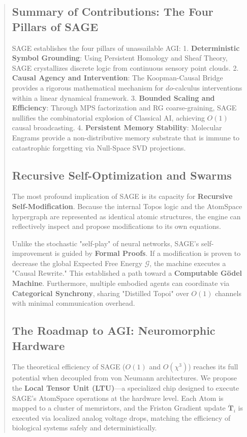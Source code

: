 \documentclass[10pt,twocolumn,letterpaper]{article}
\begin{document}
\begin{abstract}
\subsection{Summary of Contributions: The Four Pillars of SAGE}
SAGE establishes the four pillars of unassailable AGI:
1.  \textbf{Deterministic Symbol Grounding}: Using Persistent Homology and Sheaf Theory, SAGE crystallizes discrete logic from continuous sensory point clouds.
2.  \textbf{Causal Agency and Intervention}: The Koopman-Causal Bridge provides a rigorous mathematical mechanism for $do$-calculus interventions within a linear dynamical framework.
3.  \textbf{Bounded Scaling and Efficiency}: Through MPS factorization and RG coarse-graining, SAGE nullifies the combinatorial explosion of Classical AI, achieving $O(1)$ causal broadcasting.
4.  \textbf{Persistent Memory Stability}: Molecular Engrams provide a non-distributive memory substrate that is immune to catastrophic forgetting via Null-Space SVD projections.

\subsection{Recursive Self-Optimization and Swarms}
The most profound implication of SAGE is its capacity for \textbf{Recursive Self-Modification}. Because the internal Topos logic and the AtomSpace hypergraph are represented as identical atomic structures, the engine can reflectively inspect and propose modifications to its own equations. 

Unlike the stochastic "self-play" of neural networks, SAGE’s self-improvement is guided by \textbf{Formal Proofs}. If a modification is proven to decrease the global Expected Free Energy $\mathcal{G}$, the machine executes a "Causal Rewrite." This established a path toward a \textbf{Computable Gödel Machine}. Furthermore, multiple embodied agents can coordinate via \textbf{Categorical Synchrony}, sharing "Distilled Topoi" over $O(1)$ channels with minimal communication overhead.

\subsection{The Roadmap to AGI: Neuromorphic Hardware}
The theoretical efficiency of SAGE ($O(1)$ and $O(\chi^3)$) reaches its full potential when decoupled from von Neumann architectures. We propose the \textbf{Local Tensor Unit (LTU)}—a specialized chip designed to execute SAGE’s AtomSpace operations at the hardware level. Each Atom is mapped to a cluster of memristors, and the Friston Gradient update $\dot{\mathbf{T}}_i$ is executed via localized analog voltage drops, matching the efficiency of biological systems safely and deterministically.


\end{abstract}
\end{document}
